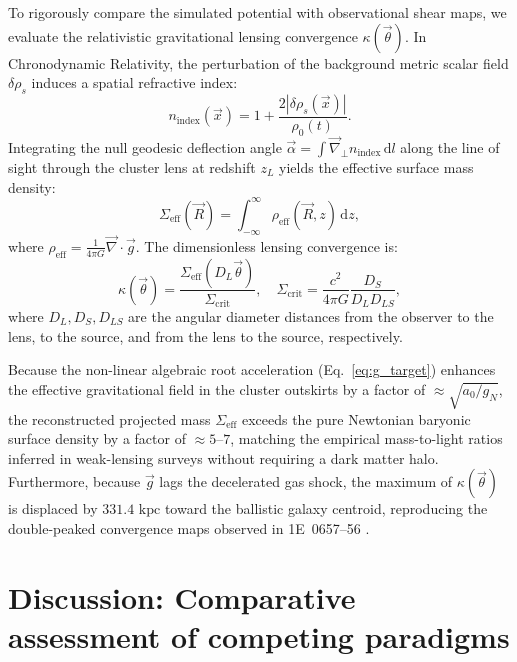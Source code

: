 \documentclass[aps,prd,reprint,superscriptaddress,nofootinbib,floatfix,amsmath,amssymb]{revtex4-2}
\begin{document}
To rigorously compare the simulated potential with observational shear maps, we evaluate the relativistic gravitational lensing convergence $\kappa(\vec{\theta})$. In Chronodynamic Relativity, the perturbation of the background metric scalar field $\delta\rho_s$ induces a spatial refractive index:
\begin{equation}
n_{\text{index}}(\vec{x}) = 1 + \frac{2|\delta\rho_s(\vec{x})|}{\rho_0(t)}.
\end{equation}
Integrating the null geodesic deflection angle $\vec{\alpha} = \int \vec{\nabla}_\perp n_{\text{index}} \, \mathrm{d}l$ along the line of sight through the cluster lens at redshift $z_L$ yields the effective surface mass density:
\begin{equation}
\Sigma_{\text{eff}}(\vec{R}) = \int_{-\infty}^{\infty} \rho_{\text{eff}}(\vec{R}, z) \, \mathrm{d}z,
\end{equation}
where $\rho_{\text{eff}} = \frac{1}{4\pi G} \vec{\nabla} \cdot \vec{g}$. The dimensionless lensing convergence is:
\begin{equation}
\kappa(\vec{\theta}) = \frac{\Sigma_{\text{eff}}(D_L \vec{\theta})}{\Sigma_{\text{crit}}}, \quad \Sigma_{\text{crit}} = \frac{c^2}{4\pi G} \frac{D_S}{D_L D_{LS}},
\label{eq:convergence}
\end{equation}
where $D_L, D_S, D_{LS}$ are the angular diameter distances from the observer to the lens, to the source, and from the lens to the source, respectively.

Because the non-linear algebraic root acceleration (Eq.~\eqref{eq:g_target}) enhances the effective gravitational field in the cluster outskirts by a factor of $\approx \sqrt{a_0 / g_N}$, the reconstructed projected mass $\Sigma_{\text{eff}}$ exceeds the pure Newtonian baryonic surface density by a factor of $\approx 5\text{--}7$, matching the empirical mass-to-light ratios inferred in weak-lensing surveys without requiring a dark matter halo. Furthermore, because $\vec{g}$ lags the decelerated gas shock, the maximum of $\kappa(\vec{\theta})$ is displaced by $331.4\text{ kpc}$ toward the ballistic galaxy centroid, reproducing the double-peaked convergence maps observed in 1E~0657--56 \cite{Clowe2006_Bullet,Bradac2006_Bullet}.

\section{Discussion: Comparative assessment of competing paradigms}
\label{sec:discussion}
\end{document}
